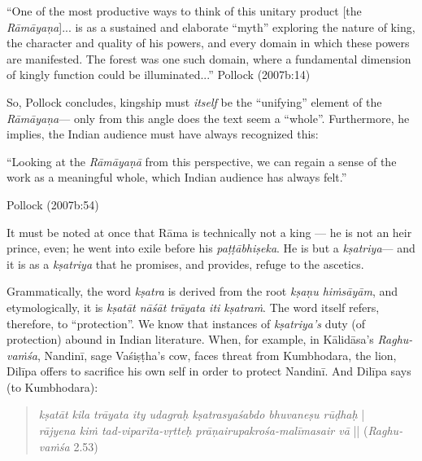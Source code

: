 \begin{myquote}
“One of the most productive ways to think of this unitary product [the {\sl Rāmāyaṇa}]... is as a sustained and elaborate “myth” exploring the nature of king, the character and quality of his powers, and every domain in which these powers are manifested. The forest was one such domain, where a fundamental dimension of kingly function could be illuminated...” 
\hfill Pollock (2007b:14)
\end{myquote}

So, Pollock concludes, kingship must {\sl itself} be the “unifying” element of the {\sl Rāmāyaṇa}--- only from this angle does the text seem a “whole”. Furthermore, he implies, the Indian audience must have always recognized this: 

\begin{myquote}
“Looking at the {\sl Rāmāyaṇā} from this perspective, we can regain a sense of the work as a meaningful whole, which Indian audience has always felt.”

\hfill  Pollock (2007b:54)
\end{myquote}

It must be noted at once that Rāma is technically not a king --- he is not an heir prince, even; he went into exile before his {\sl paṭṭābhiṣeka}. He is but a {\sl kṣatriya}--- and it is as a {\sl kṣatriya} that he promises, and provides, refuge to the ascetics. 

Grammatically, the word {\sl kṣatra} is derived from the root {\sl kṣaṇu hiṁsāyām}, and etymologically, it is {\sl kṣatāt nāśāt trāyata iti kṣatraṁ}. The word itself refers, therefore, to “protection”.  We know that instances of {\sl kṣatriya’s} duty (of protection) abound in Indian literature. When, for example, in Kālidāsa’s {\sl Raghu-vaṁśa}, Nandinī, sage Vaśiṣṭha’s cow, faces threat from Kumbhodara, the lion, Dilīpa offers to sacrifice his own self in order to protect Nandinī. And Dilīpa says (to Kumbhodara):
\begin{quote}
{{\sl kṣatāt kila trāyata ity udagraḥ kṣatrasya\newline śabdo bhuvaneṣu rūḍhaḥ}} |\\
{\sl rājyena kiṁ tad-viparīta-vṛtteḥ prāṇair\newline upakrośa-malīmasair vā} ||   
\hfill ({\sl Raghu-vaṁśa} 2.53)
\end{quote}

